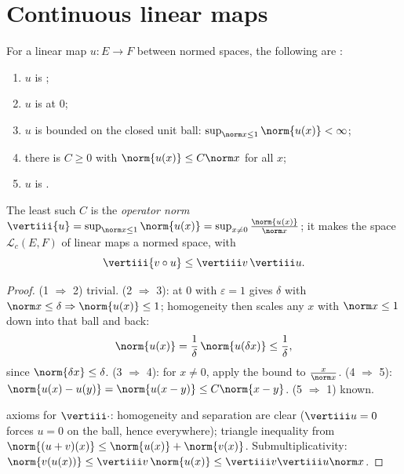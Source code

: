 \section{Continuous linear maps}

\begin{theorem}[Characterization]\label{thm:b2:nvs:continuouslinear}
For a linear map $u \colon E \to F$ between normed spaces, the
following are :
\begin{enumerate}
  \item $u$ is ;
  \item $u$ is  at $0$;
  \item $u$ is bounded on the closed unit ball: $\sup_{\norm x \leq
        1} \norm{u(x)} < \infty$;
  \item there is $C \geq 0$ with $\norm{u(x)} \leq C \norm x$ for
        all $x$;
  \item $u$ is .
\end{enumerate}
The least such $C$ is the \emph{operator norm}
$\vertiii{u} = \sup_{\norm x \leq 1}\norm{u(x)} = \sup_{x \neq 0}
\frac{\norm{u(x)}}{\norm x}$; it makes the space $\mathcal{L}_c(E,
F)$ of  linear maps a normed space, with
\[
\vertiii{v \circ u} \leq \vertiii v\, \vertiii u .
\]
\end{theorem}

\begin{proof}
(1 $\Rightarrow$ 2) trivial. (2 $\Rightarrow$ 3):  at $0$
with $\varepsilon = 1$ gives $\delta$ with $\norm x \leq \delta
\Rightarrow \norm{u(x)} \leq 1$; homogeneity then scales any $x$
with $\norm x \leq 1$ down into that ball and back:
\[
\norm{u(x)} = \frac1\delta\,\norm{u(\delta x)} \leq
\frac1\delta ,
\]
since $\norm{\delta x} \leq \delta$. (3 $\Rightarrow$ 4):
for $x \neq 0$, apply the bound to $\frac{x}{\norm x}$. (4
$\Rightarrow$ 5): $\norm{u(x) - u(y)} = \norm{u(x - y)} \leq
C\norm{x - y}$. (5 $\Rightarrow$ 1) known.

 axioms for $\vertiii\cdot$: homogeneity and separation are
clear ($\vertiii u = 0$ forces $u = 0$ on the ball, hence
everywhere); triangle inequality from $\norm{(u + v)(x)} \leq
\norm{u(x)} + \norm{v(x)}$. Submultiplicativity: $\norm{v(u(x))}
\leq \vertiii v\,\norm{u(x)} \leq \vertiii v \vertiii u \norm x$.
\end{proof}

